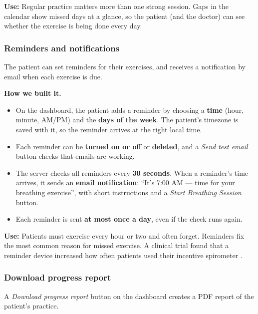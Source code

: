 \documentclass[12pt,a4paper]{article}
\begin{document}
\textbf{Use:} Regular practice matters more than one strong session. Gaps in the calendar show missed days at a glance, so the patient (and the doctor) can see whether the exercise is being done every day.

\subsubsection{Reminders and notifications}
The patient can set reminders for their exercises, and receives a notification by email when each exercise is due.

\textbf{How we built it.}
\begin{itemize}
  \item On the dashboard, the patient adds a reminder by choosing a \textbf{time} (hour, minute, AM/PM) and the \textbf{days of the week}. The patient's timezone is saved with it, so the reminder arrives at the right local time.
  \item Each reminder can be \textbf{turned on or off} or \textbf{deleted}, and a \emph{Send test email} button checks that emails are working.
  \item The server checks all reminders every \textbf{30 seconds}. When a reminder's time arrives, it sends an \textbf{email notification}: ``It's 7:00 AM --- time for your breathing exercise'', with short instructions and a \emph{Start Breathing Session} button.
  \item Each reminder is sent \textbf{at most once a day}, even if the check runs again.
\end{itemize}

\textbf{Use:} Patients must exercise every hour or two and often forget. Reminders fix the most common reason for missed exercise. A clinical trial found that a reminder device increased how often patients used their incentive spirometer \cite{eltorai2019}.

\subsubsection{Download progress report}
A \emph{Download progress report} button on the dashboard creates a PDF report of the patient's practice.
\end{document}
